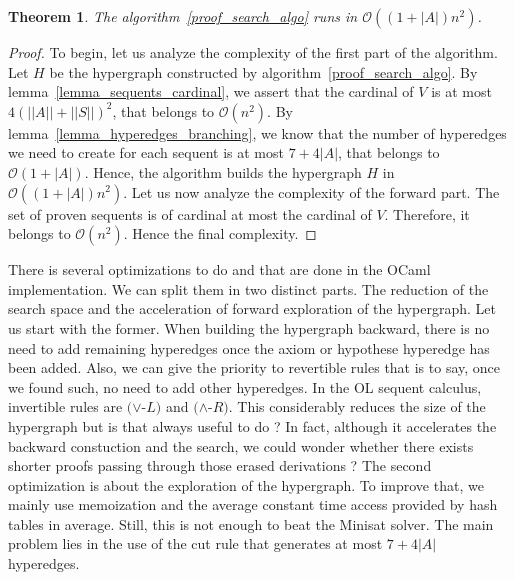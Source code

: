 \documentclass[a4paper, 11pt]{article}
\newtheorem{theorem}{Theorem}
\begin{document}
    \begin{theorem}\label{theorem_algo_complexity}
	    The algorithm~\ref{proof_search_algo} runs in $\mathcal{O}((1+|A|)n^2)$.
    \end{theorem}
    \begin{proof}
	    To begin, let us analyze the complexity of the first part of the algorithm. 
	    Let $H$ be the hypergraph constructed by algorithm~\ref{proof_search_algo}. By 
	    lemma~\ref{lemma_sequents_cardinal}, we assert that the cardinal of $V$ is at most 
	    $4(||A||+||S||)^2$, that belongs to $\mathcal{O}(n^2)$. By 
	    lemma~\ref{lemma_hyperedges_branching}, we know that the number
	    of hyperedges we need to create for each sequent is at most $7+4|A|$, that belongs to 
	    $\mathcal{O}(1+|A|)$.
	    Hence, the algorithm builds the hypergraph $H$ in $\mathcal{O}((1+|A|)n^2)$. Let us now 
	    analyze the complexity of the forward part. The set of proven sequents is of cardinal at 
	    most the cardinal of $V$. Therefore, it belongs to $\mathcal{O}(n^2)$. Hence the final
	    complexity.
	    
    \end{proof}
    There is several optimizations to do and that are done in the OCaml implementation. We can split
    them in two distinct parts. The reduction of the search space and the acceleration of forward
    exploration of the hypergraph. Let us start with the former. When building the hypergraph backward,
    there is no need to add remaining hyperedges once the axiom or hypothese hyperedge has been added.
    Also, we can give the priority to revertible rules that is to say, once we found such, no need
    to add other hyperedges. In the OL sequent calculus, invertible rules are $(\vee$-$L)$ and 
    $(\wedge$-$R)$. This considerably reduces the size of the hypergraph but is that always
    useful to do ? In fact, although it accelerates the backward constuction and the search, we could 
    wonder whether there exists shorter proofs passing 
    through those erased derivations ? The second optimization is about the exploration of the
    hypergraph. To improve that, we mainly use memoization and the average constant time access provided
    by hash tables in average.
    Still, this is not enough to beat the Minisat solver. The main problem lies in the use of the cut
    rule that generates at most $7+4|A|$ hyperedges. 
\end{document}
